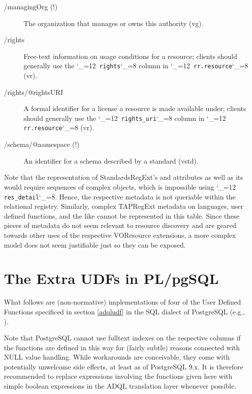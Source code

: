 \documentclass[11pt,a4paper]{ivoa}
\makeatletter
\def\rtent#1{\texttt{\color{rtcolor}\verb|#1|}}
\def\makeunderscoreletter{\catcode`\_=12}
\def\makeunderscoresubscript{\catcode`\_=8}
\def\rtent{\makeunderscoreletter\relax\rt@nt}
\def\rt@nt#1{\texttt{\color{rtcolor} #1}\makeunderscoresubscript{}}
\makeatother
\begin{document}
\begin{description}
\item[/managingOrg (!)]The organization that manages or owns this authority (vg).
\item[/rights]Free-text information on usage conditions for a resource;
clients should generally use the \rtent{rights} column in
\rtent{rr.resource} (vr).
\item[/rights/@rightsURI]A formal identifier for a license a
resource is made available under; clients should generally use the
\rtent{rights_uri} column in \rtent{rr.resource} (vr).
\item[/schema/@namespace (!)]An identifier for a schema described by a standard (vstd).

\end{description}

Note that the representation of StandardsRegExt's
  and 
attributes as well as its  would require sequences of
complex objects, which is impossible using \rtent{res_detail}.
Hence, the respective metadata is not queriable
within the relational registry. Similarly, complex TAPRegExt metadata on
languages, user defined functions, and the like cannot be
represented in this table.  Since these pieces of metadata do not seem
relevant to resource discovery and are geared towards other uses of the
respective VOResource extensions, a more complex model does not seem
justifiable just so they can be exposed.



\section{The Extra UDFs in
PL/pgSQL}

\label{appPGDefs}

What follows are (non-normative)
implementations of four of the User Defined Functions
specificed in section \ref{adqludf} in the SQL dialect
of PostgreSQL (e.g., \citet{doc:Postgres92}).

Note that PostgreSQL cannot use fulltext indexes on the respective
columns if the functions are defined in this way for (fairly subtle)
reasons connected with NULL value handling.  While workarounds are
conceivable, they come with potentially unwelcome side effects, at least
as of PostgreSQL 9.x.  It is therefore recommended to replace
expressions involving the functions given here with simple boolean
expressions in the ADQL translation layer whenever possible.
\end{document}
